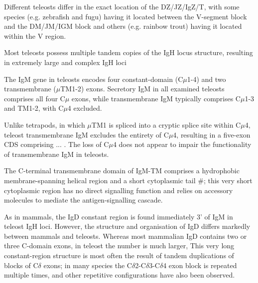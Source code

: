 Different teleosts differ in the exact location of the DZ/JZ/IgZ/T, with some species (e.g. zebrafish and fugu) having it located between the V-segment block and the DM/JM/IGM block and others (e.g. rainbow trout) having it located within the V region.

Most teleosts possess multiple tandem copies of the IgH locus structure, resulting in extremely large and complex IgH loci%


The IgM gene in teleosts encodes four constant-domain (C$\mu$1-4) and two transmembrane ($\mu$TM1-2) exons. Secretory IgM in all examined teleosts comprises all four C$\mu$ exons, while transmembrane IgM typically comprises C$\mu$1-3 and TM1-2, with C$\mu$4 excluded. %

Unlike tetrapods, in which $\mu$TM1 is spliced into a cryptic splice site within C$\mu$4, teleost transmembrane IgM excludes the entirety of C$\mu$4, resulting in a five-exon CDS comprising ... . The loss of C$\mu$4 does not appear to impair the functionality of transmembrane IgM in teleosts.

The C-terminal transmembrane domain of IgM-TM comprises a hydrophobic membrane-spanning helical region %
and a short cytoplasmic tail %
#; this very short cytoplasmic region has no direct signalling function and relies on accessory molecules to mediate the antigen-signalling cascade. %

As in mammals, the IgD constant region is found immediately 3' of IgM in teleost IgH loci. However, the structure and organisation of IgD differs markedly between mammals and teleosts. Whereas most mammalian IgD contains two or three C-domain exons, in teleost the number is much larger, %
This very long constant-region structure is most often the result of tandem duplications of blocks of C$\delta$ exons; in many species the C$\delta$2-C$\delta$3-C$\delta$4 exon block is repeated multiple times, and other repetitive configurations have also been observed. 